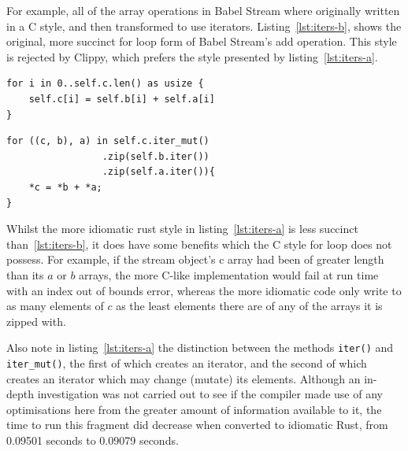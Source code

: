For example, all of the array operations in Babel Stream where originally written in a C style, and then transformed to use iterators. Listing~\ref{lst:iters-b}, shows the original, more succinct for loop form of Babel Stream's add operation. This style is rejected by Clippy, which prefers the style presented by listing~\ref{lst:iters-a}.

\noindent\begin{minipage}{.49\textwidth}
    \begin{code}
\begin{verbatim}
for i in 0..self.c.len() as usize {
    self.c[i] = self.b[i] + self.a[i]
}
\end{verbatim}
    \label{lst:iters-b}
\end{code}
\end{minipage}\hfill
\begin{minipage}{.49\textwidth}
    \begin{code}
\begin{verbatim}
for ((c, b), a) in self.c.iter_mut()
                 .zip(self.b.iter())
                 .zip(self.a.iter()){
    *c = *b + *a;
}
\end{verbatim}
\label{lst:iters-a}
\end{code}
\end{minipage}

Whilst the more idiomatic rust style in listing~\ref{lst:iters-a} is less succinct than~\ref{lst:iters-b}, it does have some benefits which the C style for loop does not possess. For example, if the stream object's c array had been of greater length than its $a$ or $b$ arrays, the more C-like implementation would fail at run time with an index out of bounds error, whereas the more idiomatic code only write to as many elements of $c$ as the least elements there are of any of the arrays it is zipped with.

Also note in listing~\ref{lst:iters-a} the distinction between the methods \texttt{iter()} and \texttt{iter\_mut()}, the first of which creates an iterator, and the second of which creates an iterator which may change (mutate) its elements. Although an in-depth investigation was not carried out to see if the compiler made use of any optimisations here from the greater amount of information available to it, the time to run this fragment did decrease when converted to idiomatic Rust, from 0.09501 seconds to 0.09079 seconds.

